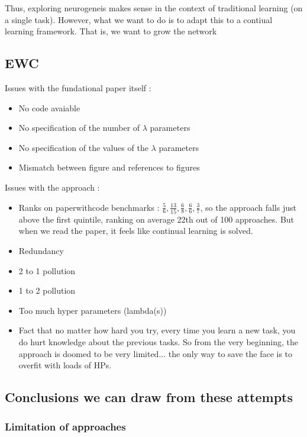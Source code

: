 \documentclass{article}
\begin{document}
Thus, exploring neurogeneis makes sense in the context of traditional learning (on a single task). However, what we want to do is to adapt this to a contiual learning framework. That is, we want to grow the network  



\subsection{EWC}


Issues with the fundational paper itself :
\begin{itemize}
    \item No code avaiable
    \item No specification of the number of $\lambda$ parameters
    \item No specification of the values of the $\lambda$ parameters
    \item Mismatch between figure and references to figures
\end{itemize}

\noindent
Issues with the approach :
\begin{itemize}
    \item Ranks on paperwithcode benchmarks : $\frac{5}{6},\frac{13}{15},\frac{6}{8},\frac{6}{6},\frac{3}{7}$, so the approach falls just above the first quintile, ranking on average 22th out of 100 approaches. But when we read the paper, it feels like continual learning is solved.
    \item Redundancy
    \item 2 to 1 pollution
    \item 1 to 2 pollution
    \item Too much hyper parameters (lambda(s))
    \item Fact that no matter how hard you try, every time you learn a new task, you do hurt knowledge about the previous tasks. So from the very beginning, the approach is doomed to be very limited... the only way to save the face is to overfit with loads of HPs.
\end{itemize}



\subsection{Conclusions we can draw from these attempts}
\subsubsection{Limitation of approaches}
\end{document}
